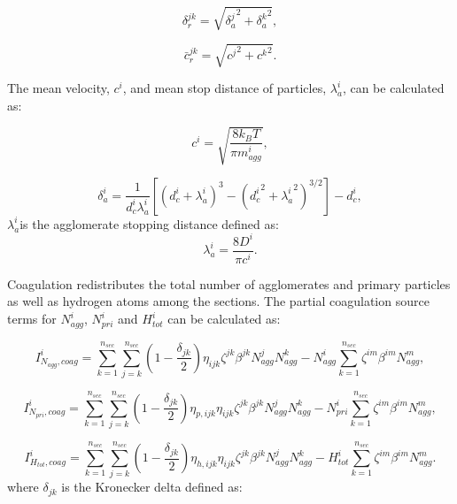 \begin{equation}
	\delta^{jk}_r=
	\sqrt{
		{\delta^j_a}^2+{\delta^k_a}^2
	}
	\label{eqn:sqrtmeandist},
\end{equation}

\begin{equation}
	\bar{c}^{jk}_r=
	\sqrt{
		{c^j}^2+{c^k}^2
	}
	\label{eqn:sqrtmeanvel}.
\end{equation}

The mean velocity, ${c^i}$, and mean stop distance of particles, ${\lambda^i_a}$, can be calculated as:

\begin{equation}
	c^i = \sqrt{\frac{8k_B T}{\pi m^i_{agg}}},
	\label{eqn:meanvel}
\end{equation}

\begin{equation}
	\delta^i_a=\frac{1}{d^i_c\lambda^i_a}
	\left[
	\left(
	d^i_c+\lambda^i_a
	\right)^3
	-\left(
	{d^i_c}^2+{\lambda^i_a}^2
	\right)^{3 / 2}
	\right]
	-d^i_{c},
	\label{eqn:meandist}
\end{equation}
\noindent $\lambda^i_a $is the agglomerate stopping distance defined as:
\begin{equation}
	\lambda^i_a = \frac{8D^i}{\pi c^i}
	\label{eqn:stopdist}.
\end{equation}


Coagulation redistributes the total number of agglomerates and primary particles as well as hydrogen atoms among the sections. The partial coagulation source terms for ${N^i_{agg}}$, ${N^i_{pri}}$ and ${H^i_{tot}}$ can be calculated as:

\begin{equation}
	I^i_{N_{agg},coag}
	=
	\sum_{k=1}^{n_{sec}}\sum_{j=k}^{n_{sec}}
	\left(
	1-\frac{\delta_{jk}}{2}
	\right)
	\eta_{ijk}\zeta^{jk}\beta^{jk}N^j_{agg}N^k_{agg}
	-
	N^i_{agg}
	\sum_{k=1}^{n_{sec}}\zeta^{im}\beta^{im}N^m_{agg},
	\label{eqn:IcoagNaggsect}
\end{equation}

\begin{equation}
	I^i_{N_{pri},coag}
	=
	\sum_{k=1}^{n_{sec}}\sum_{j=k}^{n_{sec}}
	\left(
	1-\frac{\delta_{jk}}{2}
	\right)
	\eta_{p,ijk}\eta_{ijk}\zeta^{jk}\beta^{jk}N^j_{agg}N^k_{agg}
	-
	N^i_{pri}
	\sum_{k=1}^{n_{sec}}\zeta^{im}\beta^{im}N^m_{agg},
	\label{eqn:IcoagNprisect}
\end{equation}

\begin{equation}
	I^i_{H_{tot},coag}
	=
	\sum_{k=1}^{n_{sec}}\sum_{j=k}^{n_{sec}}
	\left(
	1-\frac{\delta_{jk}}{2}
	\right)
	\eta_{h,ijk}\eta_{ijk}\zeta^{jk}\beta^{jk}N^j_{agg}N^k_{agg}
	-
	H^i_{tot}
	\sum_{k=1}^{n_{sec}}\zeta^{im}\beta^{im}N^m_{agg}.
	\label{eqn:IcoagHtotsect}
\end{equation}
\noindent where ${\delta_{jk}}$ is the Kronecker delta defined as:

